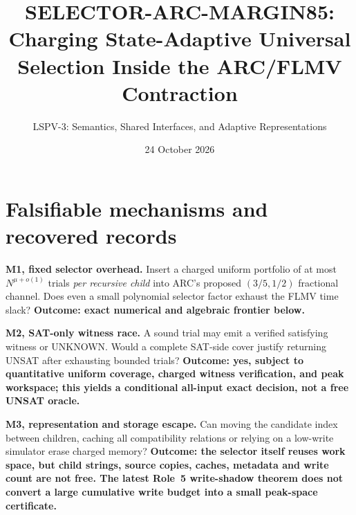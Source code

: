 \documentclass[11pt]{article}
\title{SELECTOR-ARC-MARGIN85: Charging State-Adaptive Universal Selection Inside the ARC/FLMV Contraction}
\author{LSPV-3: Semantics, Shared Interfaces, and Adaptive Representations}
\date{24 October 2026}
\begin{document}
\maketitle
\begin{center}
\end{center}

\section{Falsifiable mechanisms and recovered records}
\noindent\textbf{M1, fixed selector overhead.} Insert a charged uniform portfolio of at most $N^{\mu+o(1)}$ trials \emph{per recursive child} into ARC's proposed $(3/5,1/2)$ fractional channel. Does even a small polynomial selector factor exhaust the FLMV time slack? \textbf{Outcome: exact numerical and algebraic frontier below.}

\noindent\textbf{M2, SAT-only witness race.} A sound trial may emit a verified satisfying witness or UNKNOWN. Would a complete SAT-side cover justify returning UNSAT after exhausting bounded trials? \textbf{Outcome: yes, subject to quantitative uniform coverage, charged witness verification, and peak workspace; this yields a conditional all-input exact decision, not a free UNSAT oracle.}

\noindent\textbf{M3, representation and storage escape.} Can moving the candidate index between children, caching all compatibility relations or relying on a low-write simulator erase charged memory? \textbf{Outcome: the selector itself reuses work space, but child strings, source copies, caches, metadata and write count are not free. The latest Role~5 write-shadow theorem does not convert a large cumulative write budget into a small peak-space certificate.}
\end{document}
